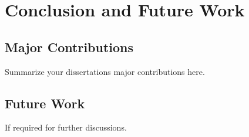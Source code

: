 \chapter{Conclusion and Future Work}
\label{ch:conclusion}

\section{Major Contributions}

Summarize your dissertations major contributions here. 


\section{Future Work}
If required for further discussions. 
